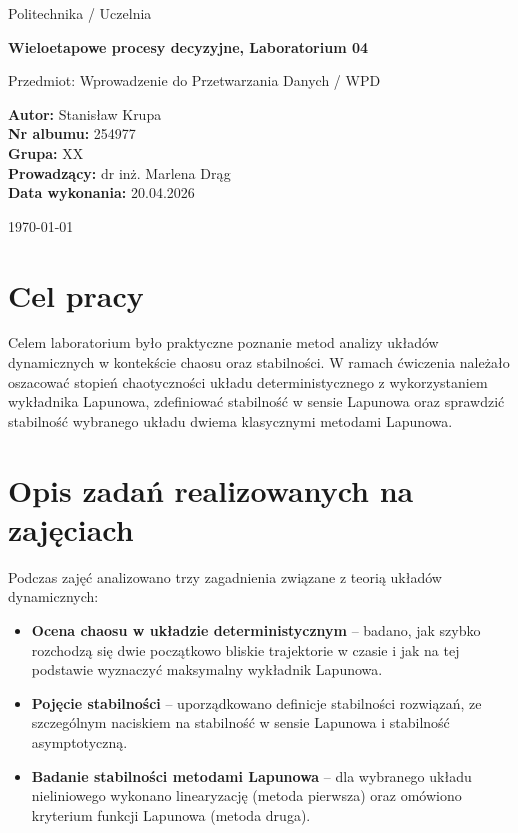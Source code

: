 \documentclass[12pt,a4paper]{article}
\begin{document}
\begin{titlepage}
    \centering
    {\large Politechnika / Uczelnia \par}
    \vspace{1.5cm}
    {\Large\bfseries Wieloetapowe procesy decyzyjne, Laboratorium 04\par}
    \vspace{1.2cm}
    {\large Przedmiot: Wprowadzenie do Przetwarzania Danych / WPD\par}
    \vspace{2cm}
    \begin{flushleft}
        \textbf{Autor:} Stanis\l{}aw Krupa \\
        \textbf{Nr albumu:} 254977 \\
        \textbf{Grupa:} XX \\
        \textbf{Prowadz\k{a}cy:} dr in\.z. Marlena Dr\k{a}g \\
        \textbf{Data wykonania:} 20.04.2026 \\
    \end{flushleft}
    \vfill
    {\large \today \par}
\end{titlepage}

\section{Cel pracy}
Celem laboratorium by\l{}o praktyczne poznanie metod analizy uk\l{}ad\'ow dynamicznych w kontek\'scie chaosu oraz stabilno\'sci. W ramach \'{c}wiczenia nale\.za\l{}o oszacowa\'c stopie\'n chaotyczno\'sci uk\l{}adu deterministycznego z wykorzystaniem wyk\l{}adnika Lapunowa, zdefiniowa\'c stabilno\'s\'c w sensie Lapunowa oraz sprawdzi\'c stabilno\'s\'c wybranego uk\l{}adu dwiema klasycznymi metodami Lapunowa.

\section{Opis zada\'n realizowanych na zaj\k{e}ciach}
Podczas zaj\k{e}\'c analizowano trzy zagadnienia zwi\k{a}zane z teori\k{a} uk\l{}ad\'ow dynamicznych:
\begin{itemize}
    \item \textbf{Ocena chaosu w uk\l{}adzie deterministycznym} -- badano, jak szybko rozchodz\k{a} si\k{e} dwie pocz\k{a}tkowo bliskie trajektorie w czasie i jak na tej podstawie wyznaczy\'c maksymalny wyk\l{}adnik Lapunowa.
    \item \textbf{Poj\k{e}cie stabilno\'sci} -- uporz\k{a}dkowano definicje stabilno\'sci rozwi\k{a}za\'n, ze szczeg\'olnym naciskiem na stabilno\'s\'c w sensie Lapunowa i stabilno\'s\'c asymptotyczn\k{a}.
    \item \textbf{Badanie stabilno\'sci metodami Lapunowa} -- dla wybranego uk\l{}adu nieliniowego wykonano linearyzacj\k{e} (metoda pierwsza) oraz om\'owiono kryterium funkcji Lapunowa (metoda druga).
\end{itemize}
\end{document}
